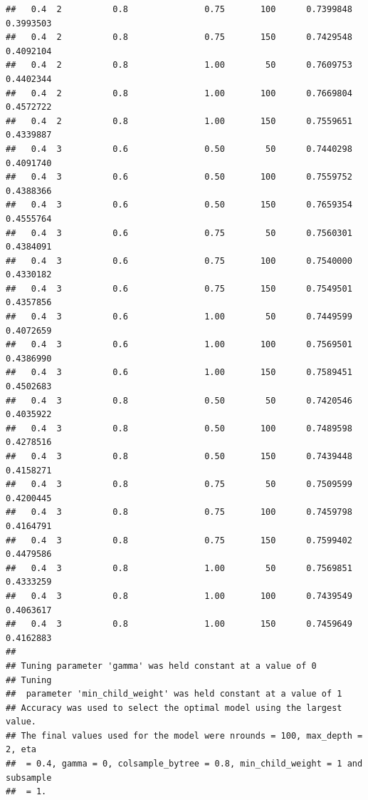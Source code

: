 \documentclass[
  spanish,
]{book}
\newenvironment{Shaded}{\begin{snugshade}}{\end{snugshade}}
\newcommand{\NormalTok}[1]{#1}
\newcommand{\OperatorTok}[1]{\textcolor[rgb]{0.81,0.36,0.00}{\textbf{#1}}}
\theoremstyle{break}
\theoremstyle{definition}
\theoremstyle{definition}
\theoremstyle{definition}
\theoremstyle{remark}
\begin{document}
\begin{verbatim}
##   0.4  2          0.8               0.75       100      0.7399848  0.3993503
##   0.4  2          0.8               0.75       150      0.7429548  0.4092104
##   0.4  2          0.8               1.00        50      0.7609753  0.4402344
##   0.4  2          0.8               1.00       100      0.7669804  0.4572722
##   0.4  2          0.8               1.00       150      0.7559651  0.4339887
##   0.4  3          0.6               0.50        50      0.7440298  0.4091740
##   0.4  3          0.6               0.50       100      0.7559752  0.4388366
##   0.4  3          0.6               0.50       150      0.7659354  0.4555764
##   0.4  3          0.6               0.75        50      0.7560301  0.4384091
##   0.4  3          0.6               0.75       100      0.7540000  0.4330182
##   0.4  3          0.6               0.75       150      0.7549501  0.4357856
##   0.4  3          0.6               1.00        50      0.7449599  0.4072659
##   0.4  3          0.6               1.00       100      0.7569501  0.4386990
##   0.4  3          0.6               1.00       150      0.7589451  0.4502683
##   0.4  3          0.8               0.50        50      0.7420546  0.4035922
##   0.4  3          0.8               0.50       100      0.7489598  0.4278516
##   0.4  3          0.8               0.50       150      0.7439448  0.4158271
##   0.4  3          0.8               0.75        50      0.7509599  0.4200445
##   0.4  3          0.8               0.75       100      0.7459798  0.4164791
##   0.4  3          0.8               0.75       150      0.7599402  0.4479586
##   0.4  3          0.8               1.00        50      0.7569851  0.4333259
##   0.4  3          0.8               1.00       100      0.7439549  0.4063617
##   0.4  3          0.8               1.00       150      0.7459649  0.4162883
## 
## Tuning parameter 'gamma' was held constant at a value of 0
## Tuning
##  parameter 'min_child_weight' was held constant at a value of 1
## Accuracy was used to select the optimal model using the largest value.
## The final values used for the model were nrounds = 100, max_depth = 2, eta
##  = 0.4, gamma = 0, colsample_bytree = 0.8, min_child_weight = 1 and subsample
##  = 1.
\end{verbatim}

\begin{Shaded}
\end{Shaded}
\end{document}
